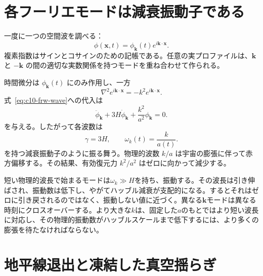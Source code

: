\begin{classroomqa}
\end{classroomqa}

\section{各フーリエモードは減衰振動子である}

一度に一つの空間波を調べる：
\begin{equation}
\phi(\mathbf x,t)
=\phi_{\mathbf k}(t)e^{i\mathbf k\cdot\mathbf x}.
\label{eq:c10-mode-ansatz}
\end{equation}
複素指数はサインとコサインのための記帳である。任意の実プロファイルは、\(\mathbf k\) と \(-\mathbf k\) の間の適切な実数関係を持つモードを重ね合わせて作られる。

時間微分は \(\phi_{\mathbf k}(t)\) にのみ作用し、一方
\[
\nabla^2e^{i\mathbf k\cdot\mathbf x}
=-k^2e^{i\mathbf k\cdot\mathbf x}.
\]
式~\eqref{eq:c10-frw-wave}への代入は
\begin{equation}
\ddot\phi_{\mathbf k}
+3H\dot\phi_{\mathbf k}
+\frac{k^2}{a^2}\phi_{\mathbf k}=0.
\label{eq:c10-mode-equation}
\end{equation}
を与える。したがって各波数は
\begin{equation}
\gamma=3H,
\qquad
\omega_k(t)=\frac{k}{a(t)}.
\label{eq:c10-mode-identification}
\end{equation}
を持つ減衰振動子のように振る舞う。物理的波数 \(k/a\) は宇宙の膨張に伴って赤方偏移する。その結果、有効復元力 \(k^2/a^2\) はゼロに向かって減少する。

短い物理的波長で始まるモードは\(\omega_k\gg H\)を持ち、振動する。その波長は引き伸ばされ、振動数は低下し、やがてハッブル減衰が支配的になる。するとそれはゼロに引き戻されるのではなく、振動しない値に近づく。異なる\(\mathbf k\)モードは異なる時刻にクロスオーバーする。より大きな\(k\)は、固定した\(a\)のもとではより短い波長に対応し、その物理的振動数がハッブルスケールまで低下するには、より多くの膨張を待たなければならない。

\section{地平線退出と凍結した真空揺らぎ}


